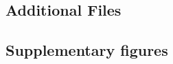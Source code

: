 \documentclass{bmcart}
\begin{document}
\begin{backmatter}

\section*{Additional Files}
  \subsection*{Supplementary figures}

\end{backmatter}
\end{document}
